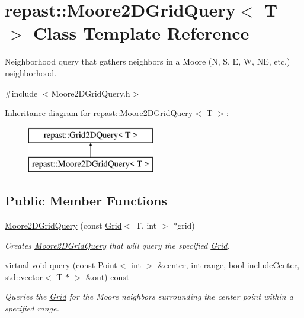 \hypertarget{classrepast_1_1_moore2_d_grid_query}{\section{repast\-:\-:Moore2\-D\-Grid\-Query$<$ T $>$ Class Template Reference}
\label{classrepast_1_1_moore2_d_grid_query}
}


Neighborhood query that gathers neighbors in a Moore (N, S, E, W, N\-E, etc.) neighborhood.  




{\ttfamily \#include $<$Moore2\-D\-Grid\-Query.\-h$>$}

Inheritance diagram for repast\-:\-:Moore2\-D\-Grid\-Query$<$ T $>$\-:\begin{figure}[H]
\begin{center}
\leavevmode
\includegraphics[height=2.000000cm]{classrepast_1_1_moore2_d_grid_query}
\end{center}
\end{figure}
\subsection*{Public Member Functions}
\begin{DoxyCompactItemize}
\item 
\hypertarget{classrepast_1_1_moore2_d_grid_query_a427a50dbe9631d9c4f7353bdf5b94bd3}{\hyperlink{classrepast_1_1_moore2_d_grid_query_a427a50dbe9631d9c4f7353bdf5b94bd3}{Moore2\-D\-Grid\-Query} (const \hyperlink{classrepast_1_1_grid}{Grid}$<$ T, int $>$ $\ast$grid)}\label{classrepast_1_1_moore2_d_grid_query_a427a50dbe9631d9c4f7353bdf5b94bd3}

\begin{DoxyCompactList}\small\item\em Creates \hyperlink{classrepast_1_1_moore2_d_grid_query}{Moore2\-D\-Grid\-Query} that will query the specified \hyperlink{classrepast_1_1_grid}{Grid}. \end{DoxyCompactList}\item 
virtual void \hyperlink{classrepast_1_1_moore2_d_grid_query_a43cd6c0a6cd2c3f1932bbaa5595b0576}{query} (const \hyperlink{classrepast_1_1_point}{Point}$<$ int $>$ \&center, int range, bool include\-Center, std\-::vector$<$ T $\ast$ $>$ \&out) const 
\begin{DoxyCompactList}\small\item\em Queries the \hyperlink{classrepast_1_1_grid}{Grid} for the Moore neighbors surrounding the center point within a specified range. \end{DoxyCompactList}\end{DoxyCompactItemize}
